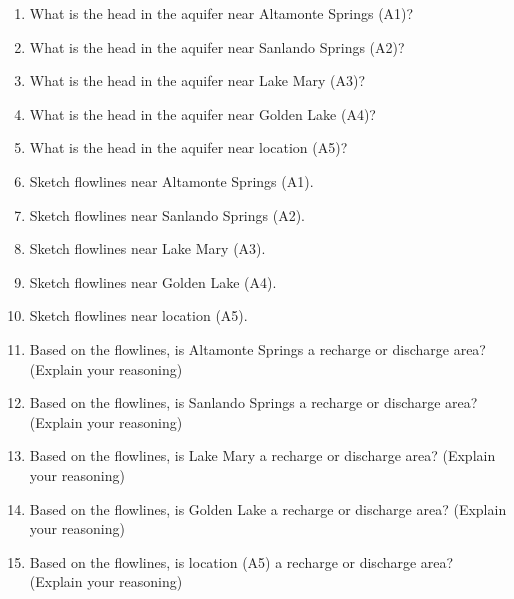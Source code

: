 \documentclass[12pt]{article}
\begin{document}
\begin{enumerate}
\begin{enumerate}
\item What is the head in the aquifer near Altamonte Springs (A1)?
\item What is the head in the aquifer near Sanlando Springs (A2)?
\item What is the head in the aquifer near Lake Mary (A3)?
\item What is the head in the aquifer near Golden Lake (A4)?
\item What is the head in the aquifer near location (A5)?
\item Sketch flowlines near Altamonte Springs (A1).
\item Sketch flowlines near Sanlando Springs (A2).
\item Sketch flowlines near Lake Mary (A3).
\item Sketch flowlines near Golden Lake (A4).
\item Sketch flowlines near location (A5).
\item Based on the flowlines, is Altamonte Springs a recharge or discharge area?  (Explain your reasoning)
\item Based on the flowlines, is Sanlando Springs a recharge or discharge area?  (Explain your reasoning)
\item Based on the flowlines, is Lake Mary a recharge or discharge area?  (Explain your reasoning)
\item Based on the flowlines, is Golden Lake a recharge or discharge area?  (Explain your reasoning)
\item Based on the flowlines, is location (A5) a recharge or discharge area?  (Explain your reasoning)
\begin{figure}[h!] %
   \centering

\end{figure}
\end{enumerate}
\end{enumerate}
\end{document}
